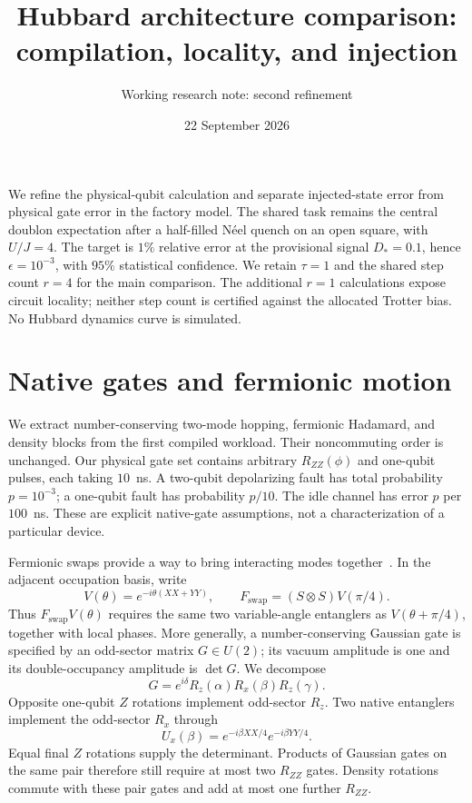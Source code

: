 \documentclass[11pt]{article}
\title{Hubbard architecture comparison: compilation, locality, and injection}
\author{Working research note: second refinement}
\date{22 September 2026}
\newcommand{\eps}{\epsilon}
\begin{document}
\maketitle

We refine the physical-qubit calculation and separate injected-state error from
physical gate error in the factory model. The shared task remains the central
doublon expectation after a half-filled N\'eel quench on an open square, with
$U/J=4$. The target is $1\%$ relative error at the provisional signal
$D_*=0.1$, hence $\eps=10^{-3}$, with $95\%$ statistical confidence. We retain
$\tau=1$ and the shared step count $r=4$ for the main comparison. The additional
$r=1$ calculations expose circuit locality; neither step count is certified
against the allocated Trotter bias. No Hubbard dynamics curve is simulated.

\section{Native gates and fermionic motion}
We extract number-conserving two-mode hopping, fermionic Hadamard, and density
blocks from the first compiled workload. Their noncommuting order is unchanged.
Our physical gate set contains arbitrary $R_{ZZ}(\phi)$ and one-qubit pulses,
each taking $10$~ns. A two-qubit depolarizing fault has total probability
$p=10^{-3}$; a one-qubit fault has probability $p/10$. The idle channel has
error $p$ per $100$~ns. These are explicit native-gate assumptions, not a
characterization of a particular device.

Fermionic swaps provide a way to bring interacting modes together~\cite{kivlichan2018}.
In the adjacent occupation basis, write
\begin{equation}
 V(\theta)=e^{-i\theta(XX+YY)},\qquad
 F_{\mathrm{swap}}=(S\otimes S)V(\pi/4).
\end{equation}
Thus $F_{\mathrm{swap}}V(\theta)$ requires the same two variable-angle
entanglers as $V(\theta+\pi/4)$, together with local phases. More generally,
a number-conserving Gaussian gate is specified by an odd-sector matrix
$G\in U(2)$; its vacuum amplitude is one and its double-occupancy amplitude
is $\det G$. We decompose
\begin{equation}
 G=e^{i\delta}R_z(\alpha)R_x(\beta)R_z(\gamma).
\end{equation}
Opposite one-qubit $Z$ rotations implement odd-sector $R_z$. Two native
entanglers implement the odd-sector $R_x$ through
\begin{equation}
 U_x(\beta)=e^{-i\beta XX/4}e^{-i\beta YY/4}.
\end{equation}
Equal final $Z$ rotations supply the determinant. Products of Gaussian gates on the same pair
therefore still require at most two $R_{ZZ}$ gates. Density rotations commute
with these pair gates and add at most one further $R_{ZZ}$.
\end{document}
